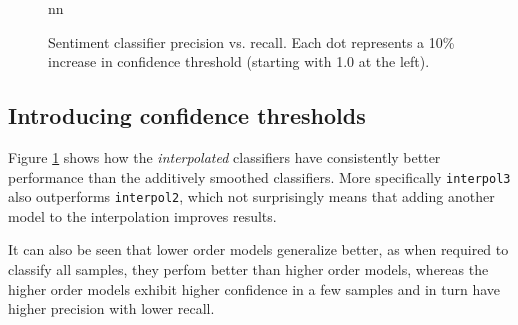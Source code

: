 \documentclass[a4paper,11pt]{kth-mag}
\begin{document}
\begin{figure}[h]
  \centering
  \caption{Sentiment classifier precision vs. recall. Each dot represents a
    10\% increase in confidence threshold (starting with 1.0 at the left).}
  \label{fig:sent_pr_curve}nn
\end{figure}


\subsection{Introducing confidence thresholds}
Figure \ref{fig:sent_pr_curve} shows how the \emph{interpolated} classifiers have
consistently better performance than the additively smoothed classifiers.
More specifically \texttt{interpol3} also outperforms \texttt{interpol2}, which
not surprisingly means that adding another model to the interpolation improves results.

It can also be seen that lower order models generalize better, as when required to
classify all samples, they perfom better than higher order models, whereas the higher
order models exhibit higher confidence in a few samples and in turn have higher
precision with lower recall.


\newpage
\end{document}
